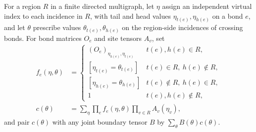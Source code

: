 \begin{definition}
    \label{def:peps_labelled_open_coefficient}
    \leanok
    For a region $R$ in a finite directed multigraph, let $\eta$ assign an
    independent virtual index to each incidence in $R$, with tail and head
    values $\eta_{t(e)},\eta_{h(e)}$ on a bond $e$, and let $\theta$ prescribe
    values $\theta_{t(e)},\theta_{h(e)}$ on the region-side incidences of
    crossing bonds. For bond matrices $O_e$ and site tensors $A_v$, set
    \begin{align}
        f_e(\eta,\theta) & =
        \begin{cases}
            (O_e)_{\eta_{h(e)},\eta_{t(e)}} & t(e),h(e)\in R,           \\
            [\eta_{t(e)}=\theta_{t(e)}]     & t(e)\in R,\ h(e)\notin R, \\
            [\eta_{h(e)}=\theta_{h(e)}]     & t(e)\notin R,\ h(e)\in R, \\
            1                               & t(e),h(e)\notin R,
        \end{cases}
        \label{eq:peps_open_bond_factor}                     \\
        c(\theta)        & =\sum_\eta\prod_ef_e(\eta,\theta)
        \prod_{v\in R}A_v(\eta_v),
        \label{eq:peps_open_coefficient}
    \end{align}
    and pair $c(\theta)$ with any joint boundary tensor $B$ by
    $\sum_\theta B(\theta)c(\theta)$.
\end{definition}
